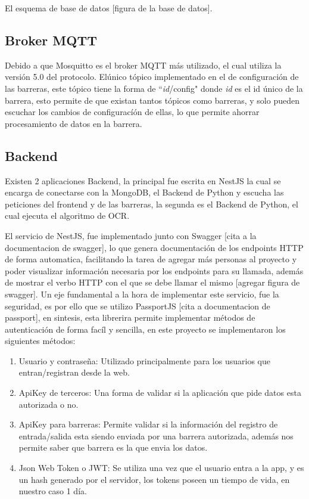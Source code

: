El esquema de base de datos [figura de la base de datos].

\subsection{Broker MQTT}

Debido a que Mosquitto es el broker MQTT más utilizado, el cual utiliza la versión 5.0 del protocolo. Elúnico tópico implementado en el de configuración de las barreras, este tópico tiene la forma de ``\textit{id}/config" donde \textit{id} es el id único de la barrera, esto permite de que existan tantos tópicos como barreras, y solo pueden escuchar los cambios de configuracíón de ellas, lo que permite ahorrar procesamiento de datos en la barrera.

\subsection{Backend}

Existen 2 aplicaciones Backend, la principal fue escrita en NestJS \cite{noauthor_documentacion_nodate-1} la cual se encarga de conectarse con la MongoDB, el Backend de Python y escucha las peticiones del frontend y de las barreras, la segunda es el Backend de Python, el cual ejecuta el algoritmo de OCR.

El servicio de NestJS, fue implementado junto con Swagger [cita  a la documentacion de swagger], lo que genera documentación de los endpoints HTTP de forma automatica, facilitando la tarea de agregar más personas al proyecto y poder visualizar información necesaria por los endpoints para su llamada, además de mostrar el verbo HTTP con el que se debe llamar el mismo [agregar figura de swagger]. Un eje fundamental a la hora de implementar este servicio, fue la seguridad, es por ello que se utilizo PassportJS [cita a documentacion de passport], en sintesis, esta librerira permite implementar métodos de autenticación de forma facíl y sencilla, en este proyecto se implementaron los siguientes métodos:

\begin{enumerate}
    \item Usuario y contraseña: Utilizado principalmente para los usuarios que entran/registran desde la web.
    \item ApiKey de terceros: Una forma de validar si la aplicación que pide datos esta autorizada o no.
    \item ApiKey para barreras: Permite validar si la información del registro de entrada/salida esta siendo enviada por una barrera autorizada, además nos permite saber que barrera es la que envia los datos.
    \item Json Web Token o JWT: Se utiliza una vez que el usuario entra a la app, y es un hash generado por el servidor, los tokens poseen un tiempo de vida, en nuestro caso 1 día.
\end{enumerate}

